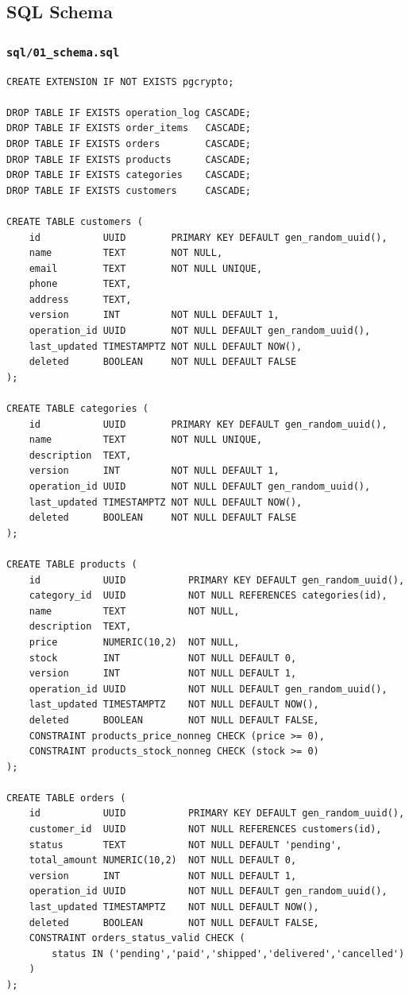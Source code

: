 \documentclass[12pt,a4paper]{article}
\begin{document}
\subsection{SQL Schema}
\label{app:schema}

\subsubsection{\texttt{sql/01\_schema.sql}}
\begin{lstlisting}[style=sqlstyle]
CREATE EXTENSION IF NOT EXISTS pgcrypto;

DROP TABLE IF EXISTS operation_log CASCADE;
DROP TABLE IF EXISTS order_items   CASCADE;
DROP TABLE IF EXISTS orders        CASCADE;
DROP TABLE IF EXISTS products      CASCADE;
DROP TABLE IF EXISTS categories    CASCADE;
DROP TABLE IF EXISTS customers     CASCADE;

CREATE TABLE customers (
    id           UUID        PRIMARY KEY DEFAULT gen_random_uuid(),
    name         TEXT        NOT NULL,
    email        TEXT        NOT NULL UNIQUE,
    phone        TEXT,
    address      TEXT,
    version      INT         NOT NULL DEFAULT 1,
    operation_id UUID        NOT NULL DEFAULT gen_random_uuid(),
    last_updated TIMESTAMPTZ NOT NULL DEFAULT NOW(),
    deleted      BOOLEAN     NOT NULL DEFAULT FALSE
);

CREATE TABLE categories (
    id           UUID        PRIMARY KEY DEFAULT gen_random_uuid(),
    name         TEXT        NOT NULL UNIQUE,
    description  TEXT,
    version      INT         NOT NULL DEFAULT 1,
    operation_id UUID        NOT NULL DEFAULT gen_random_uuid(),
    last_updated TIMESTAMPTZ NOT NULL DEFAULT NOW(),
    deleted      BOOLEAN     NOT NULL DEFAULT FALSE
);

CREATE TABLE products (
    id           UUID           PRIMARY KEY DEFAULT gen_random_uuid(),
    category_id  UUID           NOT NULL REFERENCES categories(id),
    name         TEXT           NOT NULL,
    description  TEXT,
    price        NUMERIC(10,2)  NOT NULL,
    stock        INT            NOT NULL DEFAULT 0,
    version      INT            NOT NULL DEFAULT 1,
    operation_id UUID           NOT NULL DEFAULT gen_random_uuid(),
    last_updated TIMESTAMPTZ    NOT NULL DEFAULT NOW(),
    deleted      BOOLEAN        NOT NULL DEFAULT FALSE,
    CONSTRAINT products_price_nonneg CHECK (price >= 0),
    CONSTRAINT products_stock_nonneg CHECK (stock >= 0)
);

CREATE TABLE orders (
    id           UUID           PRIMARY KEY DEFAULT gen_random_uuid(),
    customer_id  UUID           NOT NULL REFERENCES customers(id),
    status       TEXT           NOT NULL DEFAULT 'pending',
    total_amount NUMERIC(10,2)  NOT NULL DEFAULT 0,
    version      INT            NOT NULL DEFAULT 1,
    operation_id UUID           NOT NULL DEFAULT gen_random_uuid(),
    last_updated TIMESTAMPTZ    NOT NULL DEFAULT NOW(),
    deleted      BOOLEAN        NOT NULL DEFAULT FALSE,
    CONSTRAINT orders_status_valid CHECK (
        status IN ('pending','paid','shipped','delivered','cancelled')
    )
);


\end{lstlisting}
\end{document}
